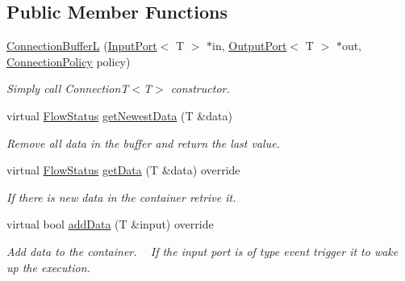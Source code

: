 \subsection*{Public Member Functions}
\begin{DoxyCompactItemize}
\item 
\hypertarget{classcoco_1_1_connection_buffer_l_af15b0bc37247b71bef3b272b2c3aae8d}{}\hyperlink{classcoco_1_1_connection_buffer_l_af15b0bc37247b71bef3b272b2c3aae8d}{Connection\+Buffer\+L} (\hyperlink{classcoco_1_1_input_port}{Input\+Port}$<$ T $>$ $\ast$in, \hyperlink{classcoco_1_1_output_port}{Output\+Port}$<$ T $>$ $\ast$out, \hyperlink{structcoco_1_1_connection_policy}{Connection\+Policy} policy)\label{classcoco_1_1_connection_buffer_l_af15b0bc37247b71bef3b272b2c3aae8d}

\begin{DoxyCompactList}\small\item\em Simply call Connection\+T$<$\+T$>$ constructor. \end{DoxyCompactList}\item 
\hypertarget{classcoco_1_1_connection_buffer_l_a8619c883cd8777a51ed52ddee3693968}{}virtual \hyperlink{namespacecoco_a057be58377e415c9be98c1dc5c8426ad}{Flow\+Status} \hyperlink{classcoco_1_1_connection_buffer_l_a8619c883cd8777a51ed52ddee3693968}{get\+Newest\+Data} (T \&data)\label{classcoco_1_1_connection_buffer_l_a8619c883cd8777a51ed52ddee3693968}

\begin{DoxyCompactList}\small\item\em Remove all data in the buffer and return the last value. \end{DoxyCompactList}\item 
\hypertarget{classcoco_1_1_connection_buffer_l_a54f7cf59bbf27a4ce0beee0c231c0bf9}{}virtual \hyperlink{namespacecoco_a057be58377e415c9be98c1dc5c8426ad}{Flow\+Status} \hyperlink{classcoco_1_1_connection_buffer_l_a54f7cf59bbf27a4ce0beee0c231c0bf9}{get\+Data} (T \&data) override\label{classcoco_1_1_connection_buffer_l_a54f7cf59bbf27a4ce0beee0c231c0bf9}

\begin{DoxyCompactList}\small\item\em If there is new data in the container retrive it. \end{DoxyCompactList}\item 
\hypertarget{classcoco_1_1_connection_buffer_l_a0f719a13d365fb116bce2477940bdb2e}{}virtual bool \hyperlink{classcoco_1_1_connection_buffer_l_a0f719a13d365fb116bce2477940bdb2e}{add\+Data} (T \&input) override\label{classcoco_1_1_connection_buffer_l_a0f719a13d365fb116bce2477940bdb2e}

\begin{DoxyCompactList}\small\item\em Add data to the container. ~\newline
 If the input port is of type event trigger it to wake up the execution. \end{DoxyCompactList}\end{DoxyCompactItemize}
